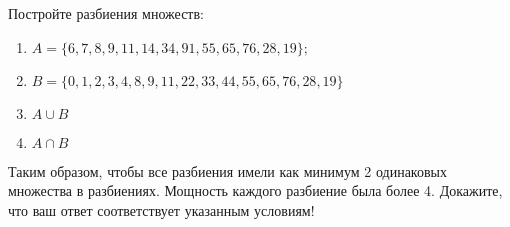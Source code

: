 \question
Постройте разбиения множеств:
\begin{enumerate}
	\renewcommand{\labelenumi}{\alph{enumi})}
	\item $A = \{6, 7, 8, 9, 11, 14, 34, 91, 55, 65, 76, 28, 19\};$
	\item $B = \{0, 1, 2, 3, 4, 8, 9, 11, 22, 33, 44, 55, 65, 76, 28, 19\}$
	\item $A \cup B$
	\item $A \cap B$
\end{enumerate}
Таким образом, чтобы все разбиения имели как минимум 2 одинаковых множества в разбиениях.
Мощность каждого разбиение была более 4.
Докажите, что ваш ответ соответствует указанным условиям!